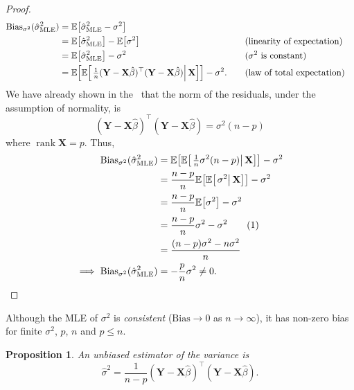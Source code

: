 \documentclass[letterpaper, reqno]{amsart}
\newtheorem{prop}{Proposition}[section]
\numberwithin{equation}{section}
\newcommand{\numberthis}{\addtocounter{equation}{1}\tag{\theequation}}
\newcommand{\T}{\top} %
\newcommand{\vect}[1]{\boldsymbol{\mathbf{#1}}} %
\newcommand{\E}[1]{\mathbb{E}\mleft[#1\mright]}
\newcommand{\by}[1]{&\quad&\text{(#1)}}
\newcommand{\Xm}{\vect{X}}
\newcommand{\Yv}{\vect{Y}}
\newcommand{\Bvh}{\hat{\beta}}
\DeclareMathOperator{\rank}{rank}
\begin{document}
\begin{proof}
  \begin{alignat*}{3}
    \mathrm{Bias}_{\sigma^2}(\hat{\sigma}_\mathrm{MLE}^2) &= \E{\hat{\sigma}_\mathrm{MLE}^2 - \sigma^2} \\
    &= \E{\hat{\sigma}_\mathrm{MLE}^2} - \E{\sigma^2} \by{linearity of expectation} \\
    &= \E{\hat{\sigma}_\mathrm{MLE}^2} - \sigma^2 \by{$\sigma^2$ is constant} \\
    &= \E{\E{\left. \tfrac{1}{n}(\Yv - \Xm\Bvh)^\T(\Yv - \Xm\Bvh) \right| \Xm}} - \sigma^2. \by{law of total expectation}
  \end{alignat*}
  We have already shown in the~ that the norm of
  the residuals, under the assumption of normality, is 
  \[ (\Yv - \Xm\Bvh)^\T(\Yv - \Xm\Bvh) = \sigma^2 (n - p) \]
  where $\rank \Xm = p$. Thus,
  \begin{align*}
    \mathrm{Bias}_{\sigma^2}(\hat{\sigma}_\mathrm{MLE}^2) &= \E{\E{\left .\tfrac{1}{n}
        \sigma^2 (n - p) \right| \Xm}} - \sigma^2 \\
    &= \frac{n-p}{n} \E{\E{\left. \sigma^2 \right| \Xm}} - \sigma^2 \\
    &= \frac{n-p}{n} \E{\sigma^2} - \sigma^2 \\
    &= \frac{n-p}{n} \sigma^2 - \sigma^2 \numberthis \label{eq:Es2} \\
    &= \frac{(n-p)\sigma^2 - n\sigma^2}{n} \\
    \implies \mathrm{Bias}_{\sigma^2}(\hat{\sigma}_\mathrm{MLE}^2) &= -\frac{p}{n} \sigma^2 \ne 0. \qedhere
  \end{align*}
\end{proof}
Although the MLE of $\sigma^2$ is \emph{consistent} ($\mathrm{Bias} \to 0$ as $n
\to \infty$), it has non-zero bias for finite $\sigma^2$, $p$, $n$ and $p \le n$.

\begin{prop}
  An unbiased estimator of the variance is
  \[ \hat{\sigma}^2 = \frac{1}{n-p} (\Yv - \Xm\Bvh)^\T(\Yv - \Xm\Bvh). \]
\end{prop}
\end{document}
